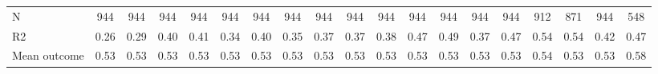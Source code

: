\begin{tabular}{lcccccccccccccccccc}
N           &         944         &         944         &         944         &         944         &         944         &         944         &         944         &         944         &         944         &         944         &         944         &         944         &         944         &         944         &         912         &         871         &         944         &         548         \\
R2          &        0.26         &        0.29         &        0.40         &        0.41         &        0.34         &        0.40         &        0.35         &        0.37         &        0.37         &        0.38         &        0.47         &        0.49         &        0.37         &        0.47         &        0.54         &        0.54         &        0.42         &        0.47         \\
Mean outcome&        0.53         &        0.53         &        0.53         &        0.53         &        0.53         &        0.53         &        0.53         &        0.53         &        0.53         &        0.53         &        0.53         &        0.53         &        0.53         &        0.53         &        0.54         &        0.53         &        0.53         &        0.58         \\
\bottomrule \end{tabular}
